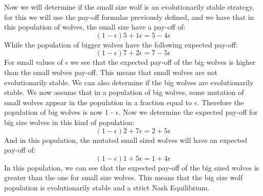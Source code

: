 Now we will determine if the small size wolf is an evolutionarily stable strategy, for this we will use the pay-off formulas previously defined, and we have that in this population of wolves, the small size have a pay-off of:
\begin{equation}
(1-{\epsilon})5 + 1{\epsilon} = 5 - 4{\epsilon}
\end{equation}
While the population of bigger wolves have the following expected pay-off:
\begin{equation}
(1-{\epsilon})7 + 2{\epsilon} = 7 - 5{\epsilon}
\end{equation}
For small values of $\epsilon$ we see that the expected pay-off of the big wolves is higher than the small wolves pay-off.  This means that small wolves are not evolutionarily stable.
We can also determine if the big wolves are evolutionarily stable. We now assume that in a population of big wolves, some mutation of small wolves appear in the population in a fraction equal to $\epsilon$. Therefore the population of big wolves is now 1 - $\epsilon$. Now we determine the expected pay-off for big size wolves in this kind of population:
 \begin{equation}
(1-{\epsilon})2 + 7{\epsilon} = 2 + 5{\epsilon}
\end{equation}
And in this population, the mutated small sized wolves will have an expected pay-off of:
\begin{equation}
(1-{\epsilon})1 + 5{\epsilon} = 1 + 4{\epsilon}
\end{equation}
In this population, we can see that the expected pay-off of the big sized wolves is greater than the one for small size wolves. This means that the big size wolf population is evolutionarily stable and a strict Nash Equilibrium.

